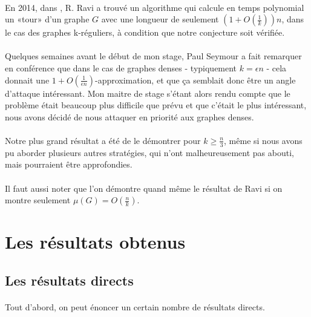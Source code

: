 \documentclass[a4paper]{article}
\theoremstyle{definition}
\theoremstyle{remark}
\begin{document}
\paragraph{}
En 2014, dans \cite{FeigeRaviSingh}, R. Ravi a trouvé un algorithme qui calcule en temps polynomial un «tour» d'un graphe $G$ avec une longueur de seulement $(1 + O
(\frac{1}{k}))n$, dans le cas des graphes k-réguliers, à condition que 
notre conjecture soit vérifiée.


\paragraph{}
Quelques semaines avant le début de mon stage, Paul Seymour a fait
remarquer en conférence que dans le cas de graphes denses - typiquement 
$k = \epsilon n$ - cela donnait une $1 + O(\frac{1}{\epsilon n})$-approximation, et que ça semblait donc être un angle d'attaque 
intéressant. Mon maitre de stage s'étant alors rendu compte que le 
problème était beaucoup plus difficile que prévu et que c'était le plus 
intéressant, nous avons décidé de nous attaquer en priorité aux
graphes denses.

\paragraph{}
Notre plus grand résultat a été de le démontrer pour $k \geq \frac{n}{3}$, même si nous avons pu aborder plusieurs autres stratégies, qui n'ont malheureusement pas 
abouti, mais pourraient être approfondies.


\paragraph{}
Il faut aussi noter que l'on démontre quand même le résultat de Ravi si on montre seulement $\mu(G)=O(\frac{n}{k})$.

\newpage

\section{Les résultats obtenus}

\subsection{Les résultats directs}

\paragraph{}
Tout d'abord, on peut énoncer un certain nombre de résultats directs.
\end{document}
